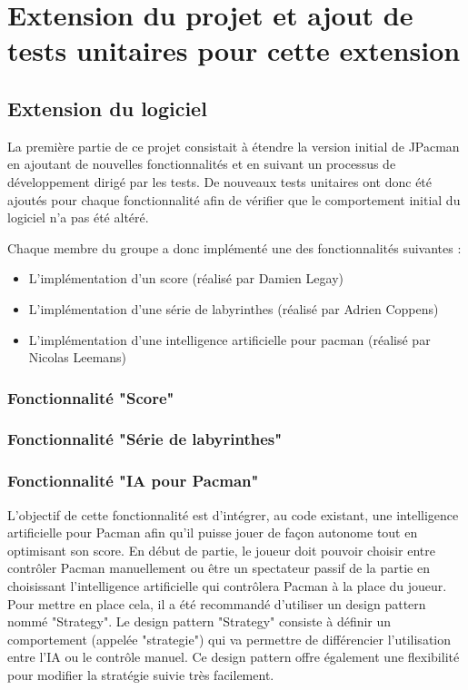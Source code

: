 \documentclass[12pt, openany]{report}
\begin{document}
\section{Extension du projet et ajout de tests unitaires pour cette extension }

\subsection{Extension du logiciel}

La première partie de ce projet consistait à étendre la version initial de JPacman en ajoutant de nouvelles fonctionnalités et en suivant un processus de développement dirigé par les tests. De nouveaux tests unitaires ont donc été ajoutés pour chaque fonctionnalité afin de vérifier que le comportement initial du logiciel n’a pas été altéré. 

Chaque membre du groupe a donc implémenté une des fonctionnalités suivantes :
\begin{itemize}
\item L'implémentation d'un score (réalisé par Damien Legay)
\item L'implémentation d'une série de labyrinthes (réalisé par Adrien Coppens)
\item L'implémentation d'une intelligence artificielle pour pacman (réalisé par Nicolas Leemans)

\end{itemize}

\subsubsection{Fonctionnalité "Score"}
\subsubsection{Fonctionnalité "Série de labyrinthes"}
\subsubsection{Fonctionnalité "IA pour Pacman"}

L'objectif de cette fonctionnalité est d'intégrer, au code existant, une intelligence artificielle pour Pacman afin qu'il puisse jouer de façon autonome tout en optimisant son score. En début de partie, le joueur doit pouvoir choisir entre contrôler Pacman manuellement ou être un spectateur passif de la partie en choisissant l'intelligence artificielle qui contrôlera Pacman à la place du joueur. Pour mettre en place cela, il a été recommandé d'utiliser un design pattern nommé "Strategy". Le design pattern "Strategy" consiste à définir un comportement (appelée "strategie") qui va permettre de différencier l'utilisation entre l'IA ou le contrôle manuel. Ce design pattern offre également une flexibilité pour modifier la stratégie suivie très facilement.
\end{document}
